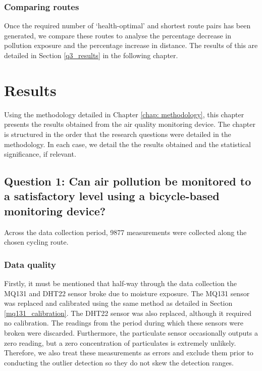 \documentclass[11pt]{report}
\begin{document}
\subsection{Comparing routes}

Once the required number of `health-optimal' and shortest route pairs has been generated, we compare these routes to analyse the percentage decrease in pollution exposure and the percentage increase in distance. The results of this are detailed in Section \ref{q3_results} in the following chapter.




\chapter{Results} \label{chap: results}

Using the methodology detailed in Chapter \ref{chap: methodology}, this chapter presents the results obtained from the air quality monitoring device. The chapter is structured in the order that the research questions were detailed in the methodology. In each case, we detail the the results obtained and the statistical significance, if relevant.

\section{Question 1: Can air pollution be monitored to a satisfactory level using a bicycle-based monitoring device?} \label{q1_results}

Across the data collection period, \num{9877} measurements were collected along the chosen cycling route. 

\subsection{Data quality}

Firstly, it must be mentioned that half-way through the data collection the MQ131 and DHT22 sensor broke due to moisture exposure. The MQ131 sensor was replaced and calibrated using the same method as detailed in Section \ref{mq131_calibration}. The DHT22 sensor was also replaced, although it required no calibration. The readings from the period during which these sensors were broken were discarded. Furthermore, the particulate sensor occasionally outputs a zero reading, but a zero concentration of particulates is extremely unlikely. Therefore, we also treat these measurements as errors and exclude them prior to conducting the outlier detection so they do not skew the detection ranges.
\end{document}
